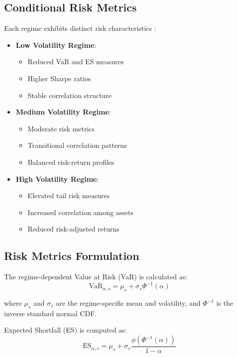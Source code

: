 \subsection{Conditional Risk Metrics}
Each regime exhibits distinct risk characteristics \citep{bollerslev1986generalized}:

\begin{itemize}
    \item \textbf{Low Volatility Regime}:
    \begin{itemize}
        \item Reduced VaR and ES measures
        \item Higher Sharpe ratios
        \item Stable correlation structure
    \end{itemize}

    \item \textbf{Medium Volatility Regime}:
    \begin{itemize}
        \item Moderate risk metrics
        \item Transitional correlation patterns
        \item Balanced risk-return profiles
    \end{itemize}

    \item \textbf{High Volatility Regime}:
    \begin{itemize}
        \item Elevated tail risk measures
        \item Increased correlation among assets
        \item Reduced risk-adjusted returns
    \end{itemize}
\end{itemize}

\subsection{Risk Metrics Formulation}
The regime-dependent Value at Risk (VaR) \citep{mcneil2015quantitative, artzner1999coherent} is calculated as:
\begin{equation}
\text{VaR}_{\alpha,s} = \mu_s + \sigma_s \Phi^{-1}(\alpha)
\end{equation}

where $\mu_s$ and $\sigma_s$ are the regime-specific mean and volatility, and $\Phi^{-1}$ is the inverse standard normal CDF.

Expected Shortfall (ES) is computed as:
\begin{equation}
\text{ES}_{\alpha,s} = \mu_s + \sigma_s \frac{\phi(\Phi^{-1}(\alpha))}{1-\alpha}
\end{equation}

